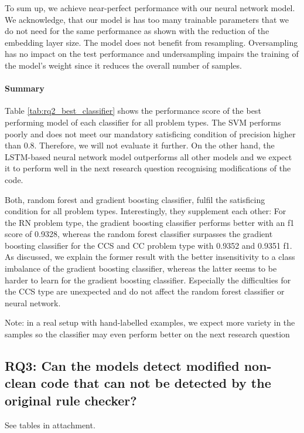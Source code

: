 To sum up, we achieve near-perfect performance with our neural network model. We acknowledge, that our model is has too many trainable parameters that we do not need for the same performance as shown with the reduction of the embedding layer size. The model does not benefit from resampling. Oversampling has no impact on the test performance and undersampling impairs the training of the model's weight since it reduces the overall number of samples.

\paragraph{Summary}

 Table \ref{tab:rq2_best_classifier} shows the performance score of the best performing model of each classifier for all problem types.
 The SVM performs poorly and does not meet our mandatory satisficing condition of precision higher than 0.8. Therefore, we will not evaluate it further. On the other hand, the LSTM-based neural network model outperforms all other models and we expect it to perform well in the next research question recognising modifications of the code.

 Both, random forest and gradient boosting classifier, fulfil the satisficing condition for all problem types. Interestingly, they supplement each other: For the RN problem type, the gradient boosting classifier performs better with an f1 score of 0.9328, whereas the random forest classifier surpasses the gradient boosting classifier for the CCS and CC problem type with 0.9352 and 0.9351 f1. As discussed, we explain the former result with the better insensitivity to a class imbalance of the gradient boosting classifier, whereas the latter seems to be harder to learn for the gradient boosting classifier. Especially the difficulties for the CCS type are unexpected and do not affect the random forest classifier or neural network.
 
 Note: in a real setup with hand-labelled examples, we expect more variety in the samples so the classifier may even perform better on the next research question 


 \subsection{RQ3: Can the models detect modified non-clean code that can not be detected by the original rule checker? }
See tables in attachment.

